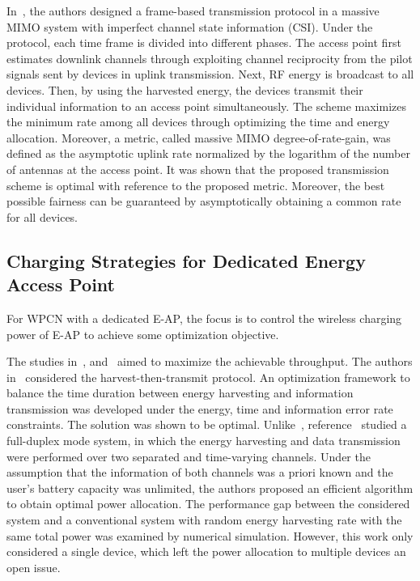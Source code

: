 \documentclass[twocolumn,10pt]{IEEEtran}
\begin{document}
In~\cite{G.1403.3991Yang}, the authors designed a frame-based transmission protocol in a massive MIMO system with imperfect channel state information (CSI). Under the protocol, each time frame is divided into different phases. The access point first estimates downlink channels through exploiting channel reciprocity from the pilot signals sent by devices in uplink transmission. Next, RF energy is broadcast to all devices. Then, by using the harvested energy, the devices transmit their individual information to an access point simultaneously. The scheme maximizes the minimum rate among all devices through optimizing the time and energy allocation. Moreover, a metric, called massive MIMO degree-of-rate-gain, was defined as the asymptotic uplink rate normalized by the logarithm of the number of antennas at the access point. It was shown that the proposed transmission scheme is optimal with reference to the proposed metric. Moreover, the best possible fairness can be guaranteed by asymptotically obtaining a common rate for all devices.
 

\subsection{Charging Strategies for Dedicated Energy Access Point}

For WPCN with a dedicated E-AP, the focus is to control the wireless charging power of E-AP to achieve some optimization objective.

The studies in~\cite{F.2015Zhao}, \cite{X.2014Zhou} and~\cite{Q.2014Sun} aimed to  maximize the achievable throughput. 
The authors in~\cite{F.2015Zhao} considered the harvest-then-transmit protocol. An optimization framework to balance the time duration between energy harvesting and information transmission was developed under the energy, time and information error rate constraints. The solution was shown to be optimal. Unlike~\cite{F.2015Zhao}, reference~\cite{X.2014Zhou} studied a full-duplex mode system, in which the energy harvesting and data transmission were performed over two separated and time-varying channels. Under the assumption that the information of both channels was a priori known and the user's battery capacity was unlimited, the authors proposed an efficient algorithm to obtain optimal power allocation. The performance gap between the considered system and a conventional system with random energy harvesting rate with the same total power was examined by numerical simulation. However, this work only considered a single device, which left the power allocation to multiple devices an open issue.
\end{document}

